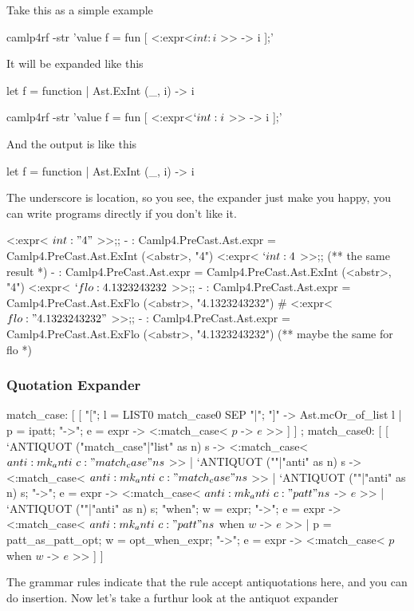 Take this as a simple example

\begin{bluetext}
camlp4rf -str 'value f = fun [ <:expr<$int:i$ >> -> i ];'
\end{bluetext}
It will be expanded like this

\begin{ocamlcode}
let f = function | Ast.ExInt (_, i) -> i
\end{ocamlcode}
\begin{bluetext}
camlp4rf -str 'value f = fun [ <:expr<$`int:i$ >> -> i ];'
\end{bluetext}
And the output is like this

\begin{ocamlcode}
let f = function | Ast.ExInt (_, i) -> i
\end{ocamlcode}
The underscore is location, so you see, the expander just make you
happy, you can write programs directly if you don't like it.

\begin{ocamlcode}
<:expr< $int: "4"$ >>;;
- : Camlp4.PreCast.Ast.expr = Camlp4.PreCast.Ast.ExInt (<abstr>, "4")
<:expr< $`int: 4$ >>;; (** the same result *)
- : Camlp4.PreCast.Ast.expr = Camlp4.PreCast.Ast.ExInt (<abstr>, "4")
<:expr< $`flo:4.1323243232$ >>;;
- : Camlp4.PreCast.Ast.expr = Camlp4.PreCast.Ast.ExFlo (<abstr>, "4.1323243232")
# <:expr< $flo:"4.1323243232"$ >>;;
- : Camlp4.PreCast.Ast.expr = Camlp4.PreCast.Ast.ExFlo (<abstr>, "4.1323243232")
(** maybe the same for flo *)
\end{ocamlcode}

\subsubsection{Quotation Expander}
\begin{ocamlcode}
    match_case:
      [ [ "["; l = LIST0 match_case0 SEP "|"; "]" -> Ast.mcOr_of_list l
        | p = ipatt; "->"; e = expr -> <:match_case< $p$ -> $e$ >> ] ]
    ;
    match_case0:
      [ [ `ANTIQUOT ("match_case"|"list" as n) s ->
            <:match_case< $anti:mk_anti ~c:"match_case" n s$ >>
        | `ANTIQUOT (""|"anti" as n) s ->
            <:match_case< $anti:mk_anti ~c:"match_case" n s$ >>
        | `ANTIQUOT (""|"anti" as n) s; "->"; e = expr ->
            <:match_case< $anti:mk_anti ~c:"patt" n s$ -> $e$ >>
        | `ANTIQUOT (""|"anti" as n) s; "when"; w = expr; "->"; e = expr ->
            <:match_case< $anti:mk_anti ~c:"patt" n s$ when $w$ -> $e$ >>
        | p = patt_as_patt_opt; w = opt_when_expr; "->"; e = expr -> <:match_case< $p$ when $w$ -> $e$ >>
      ] ]
    \end{ocamlcode}
The grammar rules indicate that the rule accept antiquotations here,
and you can do insertion.
Now let's take a furthur look at the antiquot expander

